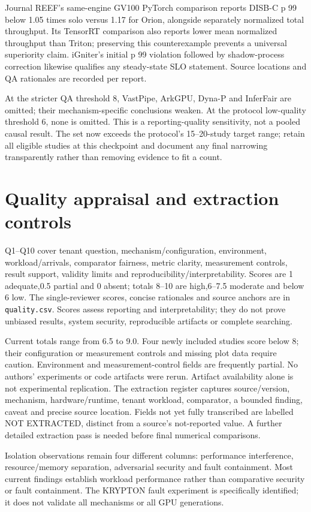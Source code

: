 \documentclass[12pt,a 4paper]{article}
\begin{document}
Journal REEF's same-engine GV100 PyTorch comparison reports DISB-C p 99 below 1.05 times solo versus 1.17 for Orion, alongside separately normalized total throughput. Its TensorRT comparison also reports lower mean normalized throughput than Triton; preserving this counterexample prevents a universal superiority claim. iGniter's initial p 99 violation followed by shadow-process correction likewise qualifies any steady-state SLO statement. Source locations and QA rationales are recorded per report.

At the stricter QA threshold 8, VastPipe, ArkGPU, Dyna-P and InferFair are omitted; their mechanism-specific conclusions weaken. At the protocol low-quality threshold 6, none is omitted. This is a reporting-quality sensitivity, not a pooled causal result. The set now exceeds the protocol's 15--20-study target range; retain all eligible studies at this checkpoint and document any final narrowing transparently rather than removing evidence to fit a count.

\section{Quality appraisal and extraction controls}
Q1--Q10 cover tenant question, mechanism/configuration, environment, workload/arrivals, comparator fairness, metric clarity, measurement controls, result support, validity limits and reproducibility/interpretability. Scores are 1 adequate,0.5 partial and 0 absent; totals 8--10 are high,6--7.5 moderate and below 6 low. The single-reviewer scores, concise rationales and source anchors are in \texttt{quality.csv}. Scores assess reporting and interpretability; they do not prove unbiased results, system security, reproducible artifacts or complete searching.

Current totals range from 6.5 to 9.0. Four newly included studies score below 8; their configuration or measurement controls and missing plot data require caution. Environment and measurement-control fields are frequently partial. No authors' experiments or code artifacts were rerun. Artifact availability alone is not experimental replication. The extraction register captures source/version, mechanism, hardware/runtime, tenant workload, comparator, a bounded finding, caveat and precise source location. Fields not yet fully transcribed are labelled NOT EXTRACTED, distinct from a source's not-reported value. A further detailed extraction pass is needed before final numerical comparisons.

Isolation observations remain four different columns: performance interference, resource/memory separation, adversarial security and fault containment. Most current findings establish workload performance rather than comparative security or fault containment. The KRYPTON fault experiment is specifically identified; it does not validate all mechanisms or all GPU generations.
\end{document}
